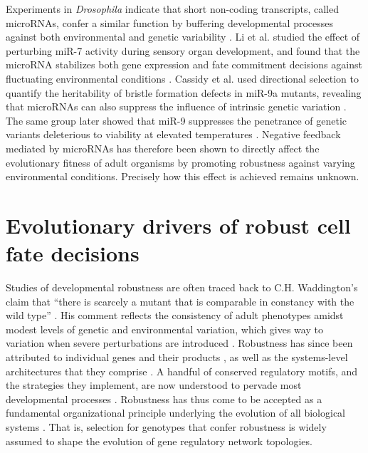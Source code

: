 Experiments in \emph{Drosophila} indicate that short non-coding transcripts, called microRNAs, confer a similar function by buffering developmental processes against both environmental and genetic variability \cite{Cassidy2016a,Cassidy2013,Li2009b,Ebert2012}. Li et al. studied the effect of perturbing miR-7 activity during sensory organ development, and found that the microRNA stabilizes both gene expression and fate commitment decisions against fluctuating environmental conditions \cite{Li2009b}. Cassidy et al. used directional selection to quantify the heritability of bristle formation defects in miR-9a mutants, revealing that microRNAs can also suppress the influence of intrinsic genetic variation \cite{Cassidy2013}. The same group later showed that miR-9 suppresses the penetrance of genetic variants deleterious to viability at elevated temperatures \cite{Cassidy2016a}. Negative feedback mediated by microRNAs has therefore been shown to directly affect the evolutionary fitness of adult organisms by promoting robustness against varying environmental conditions. Precisely how this effect is achieved remains unknown.

\section{Evolutionary drivers of robust cell fate decisions}

Studies of developmental robustness are often traced back to C.H. Waddington’s claim that “there is scarcely a mutant that is comparable in constancy with the wild type” \cite{Waddington1942}. His comment reflects the consistency of adult phenotypes amidst modest levels of genetic and environmental variation, which gives way to variation when severe perturbations are introduced \cite{Bateman1959a,Rendel1959,Rendel1966a,Scharloo1991}. Robustness has since been attributed to individual genes and their products \cite{Dun1958,Gibson1996,Rutherford1998}, as well as the systems-level architectures that they comprise \cite{Rutherford1998,Paulsen2011,Li2009b,Eldar2002,Denby2012,Cassidy2013,Cassidy2016a}. A handful of conserved regulatory motifs, and the strategies they implement, are now understood to pervade most developmental processes \cite{Freeman2000,Hartman2001,Alon2007,Marciano2014}. Robustness has thus come to be accepted as a fundamental organizational principle underlying the evolution of all biological systems \cite{Kitano2004,Stelling2004}. That is, selection for genotypes that confer robustness is widely assumed to shape the evolution of gene regulatory network topologies. 

